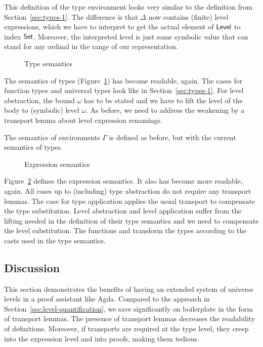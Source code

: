 \documentclass[manuscript,screen,review,anonymous]{acmart}
\begin{document}
\EHFTSEAsFunction

This definition of the type environment looks very similar to the
definition from Section~\ref{sec:types-1}. The difference is that
$\Delta$ now contains (finite) level expressions, which we have to
interpret to get the actual element of $\ALevel$ to index
$\ASet$. Moreover, the interpreted level is just some symbolic value
that can stand for any ordinal in the range of our representation.

\begin{figure}[tp]
  \EHTSem
  \caption{Type semantics}
  \label{fig:eh-semantics-types}
\end{figure}
The semantics of types (Figure~\ref{fig:eh-semantics-types}) has
become readable, again. The cases for function types and universal
types look like in Section~\ref{sec:types-1}. For level abstraction,
the bound $\omega$ has to be stated and we have to lift the level of
the body to (symbolic) level $\omega$. As before, we need to address
the weakening by a transport lemma  about level
expression renamings.

The semantics of environments $\Gamma$ is defined as before, but with
the current semantics of types.
\begin{figure}
  \EHESem
  \caption{Expression semantics}
  \label{fig:eh-expression-semantics}
\end{figure}

Figure~\ref{fig:eh-expression-semantics} defines the expression
semantics. It also has become more readable, again. All cases up to
(including) type abstraction do not require any transport lemmas. The
case for type application applies the usual transport to compensate
the type substitution. Level abstraction and level application suffer
from the lifting needed in the definition of their type semantics and
we need to compensate the level substitution. The functions
 and  transform the
types according to the casts used in the type semantics.

\subsection{Discussion}
\label{sec:discussion-2}

This section demonstrates the benefits of having an extended system of
universe levels in a proof assistant like Agda. Compared to the
approach in Section~\cref{sec:level-quantification}, we save
significantly on boilerplate in the form of transport lemmas. The
presence of transport lemmas decreases the readability of
definitions. Moreover, if transports are required at the type level,
they creep into the expression level and into proofs, making them tedious.
\end{document}
